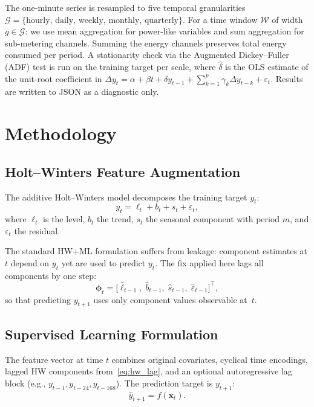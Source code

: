 \documentclass[10pt,twocolumn,letterpaper]{article}
\begin{document}
The one-minute series is resampled to five temporal granularities
$\mathcal{G} = \{\text{hourly, daily, weekly, monthly, quarterly}\}$.
For a time window $\mathcal{W}$ of width $g \in \mathcal{G}$:
we use mean aggregation for power-like variables and sum aggregation for
sub-metering channels.
Summing the energy channels preserves total energy consumed per period.
A stationarity check via the Augmented Dickey--Fuller (ADF) test is
run on the training target per scale,
where $\hat{\delta}$ is the OLS estimate of the unit-root coefficient
in $\Delta y_t = \alpha + \beta t + \delta y_{t-1}
+ \sum_{k=1}^{p}\gamma_k\Delta y_{t-k} + \varepsilon_t$.
Results are written to JSON as a diagnostic only.

\section{Methodology}

\subsection{Holt--Winters Feature Augmentation}

The additive Holt--Winters model decomposes the training target $y_t$:
\begin{equation}
  y_t = \ell_t + b_t + s_t + \varepsilon_t,
  \label{eq:hw_decomp}
\end{equation}
where $\ell_t$ is the level, $b_t$ the trend, $s_t$ the seasonal
component with period $m$, and $\varepsilon_t$ the residual.

The standard HW+ML formulation suffers from leakage: component
estimates at $t$ depend on $y_t$ yet are used to predict $y_t$.
The fix applied here lags all components by one step:
\begin{equation}
  \bm{\phi}_t =
  \bigl[\hat{\ell}_{t-1},\;\hat{b}_{t-1},\;\hat{s}_{t-1},\;\hat{\varepsilon}_{t-1}\bigr]^\top,
  \label{eq:hw_lag}
\end{equation}
so that predicting $y_{t+1}$ uses only component values observable
at~$t$.

\subsection{Supervised Learning Formulation}

The feature vector at time $t$ combines original covariates, cyclical
time encodings, lagged HW components from~\eqref{eq:hw_lag}, and an
optional autoregressive lag block (e.g., $y_{t-1}, y_{t-24}, y_{t-168}$).
The prediction target is $y_{t+1}$:
\begin{equation}
  \hat{y}_{t+1} = f(\mathbf{x}_t).
  \label{eq:supervised}
\end{equation}
\end{document}
